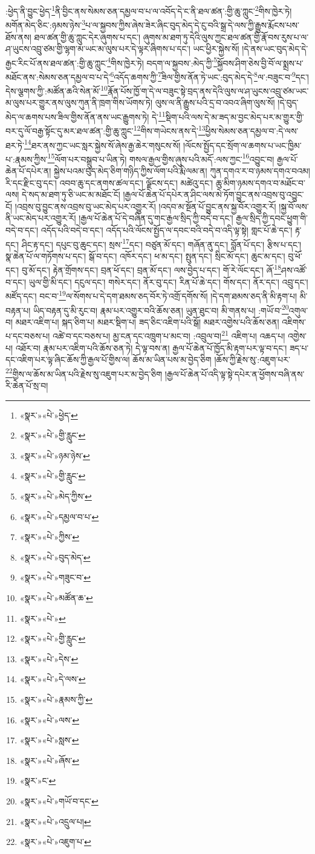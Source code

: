 :ཕྱེད་ནི་བྱུང་ཕྱེད་\footnote{«སྣར་»«པེ་»ཕྱེད་}ནི་བྱིང་ནས་སེམས་ཅན་དམྱལ་བ་པ་ལ་འབོད་དེ་ང་ནི་ཐལ་ཚན་:གྱི་ཆུ་ཀླུང་\footnote{«སྣར་»«པེ་»གྱི་རླུང་}གིས་ཁྱེར་ཏེ། མགོན་མེད་ཅིང་:ཉམས་ཉེས་\footnote{«སྣར་»«པེ་»ཉམ་ཉེས་}པ་ལ་སྐྱབས་ཀྱིས་ཞེས་ཟེར་ཞིང་བུད་མེད་དེ་ངུ་བའི་སྒྲ་དེ་ལས་ཀྱི་རྒྱུས་རྨོངས་པས་ཐོས་ནས། ཐལ་ཚན་གྱི་ཆུ་ཀླུང་དེར་ཞུགས་པ་དང་། ཞུགས་མ་ཐག་ཏུ་དེའི་ལུས་ཀྱང་ཐལ་ཚན་གྱི་རྣོ་བས་རུས་པ་ལ་ཤ་ཡུངས་འབྲུ་ཙམ་གྱི་ལྷག་མ་ཡང་མ་ལུས་པར་དེ་ལྟར་ཞིགས་པ་དང་། ཡང་ཕྱིར་སྐྱེས་སོ། །དེ་ནས་ཡང་བུད་མེད་དེ་རྒྱང་རིང་པོ་ནས་ཐལ་ཚན་:གྱི་ཆུ་ཀླུང་\footnote{«སྣར་»«པེ་»གྱི་རླུང་}གིས་ཁྱེར་ཏེ། བདག་ལ་སྐྱབས་:མེད་ཀྱི་\footnote{«སྣར་»«པེ་»མེད་ཀྱིས་}སྐྱོབས་ཤིག་ཅེས་བྱི་བོ་ལ་སྨྲས་པ་མཐོང་ནས་:སེམས་ཅན་དམྱལ་བ་པ་དེ་\footnote{«སྣར་»«པེ་»དམྱལ་བ་པ་}འདོད་ཆགས་ཀྱི་\footnote{«སྣར་»«པེ་»ཀྱིས་}ཟིལ་གྱིས་ནོན་ཏེ་ཡང་:བུད་མེད་དེ་\footnote{«སྣར་»«པེ་»བུད་མེད་}ལ་:བཟུང་བ་\footnote{«སྣར་»«པེ་»གཟུང་བ་}དང་། དེས་ལྕགས་ཀྱི་:མཚོན་ཆའི་སེན་མོ་\footnote{«སྣར་»«པེ་»མཚོན་ཆ་}རྣོན་པོས་ཁྱོ་ག་དེ་ལ་བཟུང་སྟེ་བྲད་ནས་དེའི་ལུས་ལ་ཤ་ཡུངས་འབྲུ་ཙམ་ཡང་མ་ལུས་པར་གྱུར་ནས་ལུས་ཀུན་ནི་ཁྲག་གིས་ཡོགས་ཏེ། ལུས་ལ་ནི་རྒྱུས་པའི་དྲ་བ་འབའ་ཞིག་ལུས་སོ། །དེ་བུད་མེད་ལ་ཆགས་པས་ཟིལ་གྱིས་ནོན་ནས་ཡང་རྒྱུགས་ཏེ། དེ་\footnote{«སྣར་»«པེ་»}སྡིག་པའི་ལས་དེ་མ་ཟད་མ་བྱང་མེད་པར་མ་གྱུར་གྱི་བར་དུ་ལོ་བརྒྱ་སྟོང་དུ་མར་ཐལ་ཚན་:གྱི་ཆུ་ཀླུང་\footnote{«སྣར་»«པེ་»གྱི་རླུང་}གིས་གཡེངས་ནས་དེ་\footnote{«སྣར་»«པེ་»དེས་}ཕྱིས་སེམས་ཅན་དམྱལ་བ་:དེ་ལས་ཐར་ཏེ་\footnote{«སྣར་»«པེ་»དེ་ལས་}ཐར་ནས་ཀྱང་ཡང་སླར་སྐྱེས་སོ་ཞེས་རྒྱ་ཆེར་གསུངས་སོ། །ལོངས་སྤྱོད་དང་སྲོག་ལ་ཆགས་པ་ཡང་ཁྱིམ་པ་:རྣམས་ཀྱིས་\footnote{«སྣར་»«པེ་»རྣམས་ཀྱི་}ལོག་པར་བསྒྲུབ་པ་ཡིན་ཏེ། གསལ་རྒྱལ་གྱིས་ཞུས་པའི་མདོ་:ལས་ཀྱང་\footnote{«སྣར་»«པེ་»ལས་}འབྱུང་བ། རྒྱལ་པོ་ཆེན་པོ་དཔེར་ན། སྐྱེས་པའམ་བུད་མེད་ཅིག་གཉིད་ཀྱིས་ལོག་པའི་རྨི་ལམ་ན། ཀུན་དགའ་ར་བ་ཉམས་དགའ་བའམ། རི་དང་རྫིང་བུ་དང་། འབབ་ཆུ་དང་ནགས་ཚལ་དང་། ལྗོངས་དང་། མཚེའུ་དང་། ཆུ་མིག་ཉམས་དགའ་བ་མཐོང་བ་ལས། དེ་སད་མ་ཐག་ཏུ་ཅི་ཡང་མ་མཐོང་ངོ། །རྒྱལ་པོ་ཆེན་པོ་དཔེར་ན་ཤིང་ལས་མེ་ཏོག་བྱུང་ནས་འབྲས་བུ་འབྱུང་ངོ། །འབྲས་བུ་བྱུང་ནས་འབྲས་བུ་ཡང་མེད་པར་འགྱུར་རོ། །འདབ་མ་སྔོན་པོ་བྱུང་ནས་སྐྱ་བོར་འགྱུར་རོ། །སྐྱ་བོ་ལས་ནི་ཡང་མེད་པར་འགྱུར་རོ། །རྒྱལ་པོ་ཆེན་པོ་དེ་བཞིན་དུ་གང་རྒྱལ་སྲིད་ཀྱི་བདེ་བ་དང་། རྒྱལ་སྲིད་ཀྱི་དབང་ཕྱུག་གི་བདེ་བ་དང་། འདོད་པའི་བདེ་བ་དང་། འདོད་པའི་ལོངས་སྤྱོད་ལ་དབང་བའི་བདེ་བ་འདི་ལྟ་སྟེ། གླང་པོ་ཆེ་དང་། རྟ་དང་། ཤིང་རྟ་དང་། དཔུང་བུ་ཆུང་དང་། སྲས་\footnote{«སྣར་»«པེ་»སླས་}དང་། བཙུན་མོ་དང་། གཞོན་ནུ་དང་། བློན་པོ་དང་། རྩིས་པ་དང་། སྣ་ཆེན་པོ་ལ་གཏོགས་པ་དང་། སྒོ་བ་དང་། འཁོར་དང་། ཕ་མ་དང་། སྤུན་དང་། སྲིང་མོ་དང་། ཆུང་མ་དང་། བུ་ཕོ་དང་། བུ་མོ་དང་། རྟེན་གྲོགས་དང་། བྲན་ཕོ་དང་། བྲན་མོ་དང་། ལས་བྱེད་པ་དང་། གོ་རེ་ལོང་དང་། ཞོ་\footnote{«སྣར་»«པེ་»ཞོས་}ཤས་འཚོ་བ་དང་། ཡུལ་གྱི་མི་དང་། དངུལ་དང་། གསེར་དང་། ནོར་བུ་དང་། རིན་པོ་ཆེ་དང་། གོས་དང་། ནོར་དང་། འབྲུ་དང་། མཛོད་དང་། བང་བ་\footnote{«སྣར་»ང་}ལ་སོགས་པ་དེ་དག་ཐམས་ཅད་བོར་ཏེ་འགྲོ་དགོས་སོ། །དེ་དག་ཐམས་ཅད་ནི་མི་རྟག་པ། མི་བརྟན་པ། ཡིད་བརྟན་དུ་མི་རུང་བ། རྣམ་པར་འགྱུར་བའི་ཆོས་ཅན། ཡུན་ཐུང་བ། མི་གནས་པ། :གཡོ་བ་\footnote{«སྣར་»«པེ་»གཡོ་བ་དང་}འགུལ་བ། མཐར་འཇིག་པ། སྐད་ཅིག་པ། མཐར་སྡིག་པ། ཟད་ཅིང་འཇིག་པའི་སྒོ། མཐར་འགྱེས་པའི་ཆོས་ཅན། འཇིགས་པ་དང་བཅས་པ། འཚེ་བ་དང་བཅས་པ། མྱ་ངན་དང་འཁྲུག་པ་མང་བ། :འབྲུལ་བ།\footnote{«སྣར་»«པེ་»འདྲུལ་པ།} འཇིག་པ། འཆད་པ། འགྱེས་པ། འཐོར་བ། རྣམ་པར་འཇིག་པའི་ཆོས་ཅན་ཏེ། དེ་ལྟ་བས་ན། རྒྱལ་པོ་ཆེན་པོ་ཁྱོད་མི་རྟག་པར་ལྟ་བ་དང་། ཟད་པ་དང་འཇིག་པར་ལྟ་ཞིང་ཆོས་ཀྱི་རྒྱལ་པོ་གྱིས་ལ། ཆོས་མ་ཡིན་པས་མ་བྱེད་ཅིག །ཆོས་ཀྱི་རྗེས་སུ་:འཇུག་པར་\footnote{«སྣར་»«པེ་»འཇུག་པ་}གྱིས་ལ་ཆོས་མ་ཡིན་པའི་རྗེས་སུ་འཇུག་པར་མ་བྱེད་ཅིག །རྒྱལ་པོ་ཆེན་པོ་འདི་ལྟ་སྟེ་དཔེར་ན་ཕྱོགས་བཞི་ནས་རི་ཆེན་པོ་སྲ་བ། 
